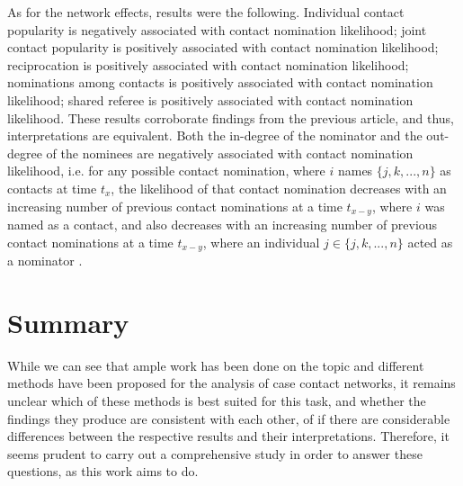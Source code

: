 As for the network effects, results were the following. Individual contact popularity is negatively associated with contact nomination likelihood; joint contact popularity is positively associated with contact nomination likelihood; reciprocation is positively associated with contact nomination likelihood; nominations among contacts is positively associated with contact nomination likelihood; shared referee is positively associated with contact nomination likelihood. These results corroborate findings from the previous article, and thus, interpretations are equivalent. Both the in-degree of the nominator and the out-degree of the nominees are negatively associated with contact nomination likelihood, i.e. for any possible contact nomination, where $i$ names $\{j,k,...,n\}$ as contacts at time $t_x$, the likelihood of that contact nomination decreases with an increasing number of previous contact nominations at a time $t_{x-y}$, where $i$ was named as a contact, and also decreases with an increasing number of previous contact nominations at a time $t_{x-y}$, where an individual $j \in \{j,k,...,n\}$ acted as a nominator \cite{hancean2021role,hancean2022occupations}. 

\section{Summary}
\label{sec:prev_summary}

While we can see that ample work has been done on the topic and different methods have been proposed for the analysis of case contact networks, it remains unclear which of these methods is best suited for this task, and whether the findings they produce are consistent with each other, of if there are considerable differences between the respective results and their interpretations. Therefore, it seems prudent to carry out a comprehensive study in order to answer these questions, as this work aims to do. 

